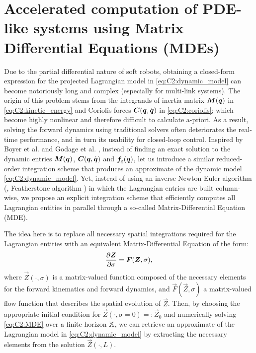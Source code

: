 \section[Accelerated computation of PDE-like systems]{Accelerated computation of PDE-like systems using Matrix Differential Equations (MDEs)}
\label{sec: chap2 section header}
Due to the partial differential nature of soft robots, obtaining a closed-form expression for the projected Lagrangian model in \eqref{eq:C2:dynamic_model} can become notoriously long and complex (especially for multi-link systems). The origin of this problem stems from the integrands of inertia matrix $\boldsymbol{M}({\boldsymbol{q}})$ in \eqref{eq:C2:kinetic_energy} and Coriolis forces $\boldsymbol{C}({\boldsymbol{q}},{\dot{\boldsymbol{q}}})$ in \eqref{eq:C2:coriolis}; which become highly nonlinear and therefore difficult to calculate a-priori. As a result, solving the forward dynamics using traditional solvers often deteriorates the real-time performance, and in turn its usability for closed-loop control. Inspired by Boyer et al. \cite{Boyer2021} and Godage et al. 
\cite{Godage2016}, instead of finding an exact solution to the dynamic entries $\boldsymbol{M}({\boldsymbol{q}})$, $\boldsymbol{C}({\boldsymbol{q}},{\dot{\boldsymbol{q}}})$ and $\boldsymbol{f}\!_{\scriptstyle\textrm{g}}({\boldsymbol{q}})$, let us introduce a similar reduced-order integration scheme that produces an approximate of the dynamic model \eqref{eq:C2:dynamic_model}. Yet, instead of using an inverse Newton-Euler algorithm (\ie, Featherstone algorithm \cite{Spong2006}) in which the Lagrangian entries are built column-wise, we propose an explicit integration scheme that efficiently computes all Lagrangian entities in parallel through a so-called Matrix-Differential Equation (MDE).

The idea here is to replace all necessary spatial integrations required for the Lagrangian entities with an equivalent Matrix-Differential Equation of the form:
%
\begin{equation}
\frac{\partial \boldsymbol{Z}}{\partial \sigma} = \boldsymbol{F}(\boldsymbol{Z},\sigma), \label{eq:C2:MDE}
\end{equation}
%
where $\vec{Z}(\cdot,\sigma)$ is a matrix-valued function composed of the necessary elements for the forward kinematics and forward dynamics, and $\vec{F}(\vec{Z},\sigma)$ a matrix-valued flow function that describes the spatial evolution of $\vec{Z}$. Then, by choosing the appropriate initial condition for $\vec{Z}(\cdot,\sigma = 0) =: \vec{Z}_0$ and numerically solving \eqref{eq:C2:MDE} over a finite horizon $\mathbb{X}$, we can retrieve an approximate of the Lagrangian model in
\eqref{eq:C2:dynamic_model} by extracting the necessary elements from the solution $\vec{Z}(\cdot,L)$.

